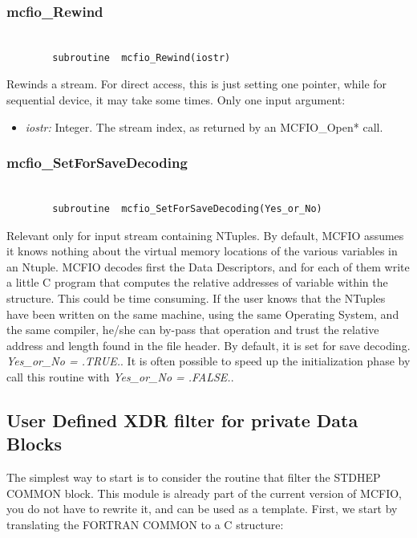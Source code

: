 \subsubsection{mcfio\_Rewind}

\begin{verbatim}

        subroutine  mcfio_Rewind(iostr)

\end{verbatim}

Rewinds a stream. For direct access, this is just setting
one pointer, while for sequential device, it may take some
times.  Only one input argument:
\begin{itemize}
\item {\em iostr:} Integer. The stream index, as returned by an MCFIO\_Open*
call.
\end{itemize}

\subsubsection{mcfio\_SetForSaveDecoding}

\begin{verbatim}

        subroutine  mcfio_SetForSaveDecoding(Yes_or_No)

\end{verbatim}

Relevant only for input stream containing NTuples.
By default, MCFIO assumes it knows nothing about the virtual memory
locations of the various variables in an Ntuple.  MCFIO decodes first the
Data Descriptors, and for each of them write a little C program that
computes the relative addresses of variable within the structure.
This could be time consuming.  If the user knows that the NTuples have
been written on the same machine, using the same Operating System, and the same
compiler, he/she can by-pass that operation and trust the relative address and
length found in the file header.  By default, it is set for save decoding.
{\em Yes\_or\_No = .TRUE.}. It is often possible to speed up the initialization
phase by call this routine with  {\em Yes\_or\_No = .FALSE.}.

\subsection{User Defined XDR filter for private Data Blocks}

	The simplest way to start is to consider the routine that
filter the STDHEP COMMON block.  This module is already part of
the current version of MCFIO, you do not have to rewrite it, and
can be used as a template. First, we start by translating the FORTRAN
COMMON to a C structure:

